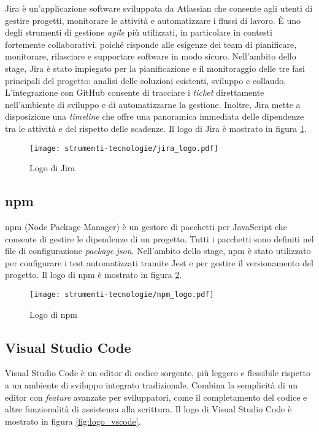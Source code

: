 \par Jira è un'applicazione software sviluppata da Atlassian che consente agli utenti di gestire progetti, monitorare le attività e automatizzare i flussi di lavoro. È uno degli strumenti di gestione \textit{agile} più utilizzati, in particolare in contesti fortemente collaborativi, poiché risponde alle esigenze dei team di pianificare, monitorare, rilasciare e supportare software in modo sicuro. Nell’ambito dello stage, Jira è stato impiegato per la pianificazione e il monitoraggio delle tre fasi principali del progetto: analisi delle soluzioni esistenti, sviluppo e collaudo. L’integrazione con GitHub consente di tracciare i \textit{ticket} direttamente nell’ambiente di sviluppo e di automatizzarne la gestione. Inoltre, Jira mette a disposizione una \textit{timeline} che offre una panoramica immediata delle dipendenze tra le attività e del rispetto delle scadenze. Il logo di Jira è mostrato in figura \ref{fig:logo_jira}.

\begin{figure}[H]
  \centering 
  \texttt{[image: strumenti-tecnologie/jira\_logo.pdf]} 
  \caption{Logo di Jira}
  \label{fig:logo_jira}
\end{figure}

\subsection*{npm}

\par npm (Node Package Manager) è un gestore di pacchetti per JavaScript che consente di gestire le dipendenze di un progetto. Tutti i pacchetti sono definiti nel file di configurazione \textit{package.json}. Nell’ambito dello stage, npm è stato utilizzato per configurare i test automatizzati tramite Jest e per gestire il versionamento del progetto. Il logo di npm è mostrato in figura \ref{fig:logo_npm}.

\begin{figure}[H]
  \centering 
  \texttt{[image: strumenti-tecnologie/npm\_logo.pdf]}
  \caption{Logo di npm}
  \label{fig:logo_npm} 
\end{figure}

\subsection*{Visual Studio Code}

\par Visual Studio Code è un editor di codice sorgente, più leggero e flessibile rispetto a un ambiente di sviluppo integrato tradizionale. Combina la semplicità di un editor con \textit{feature} avanzate per sviluppatori, come il completamento del codice e altre funzionalità di assistenza alla scrittura. Il logo di Visual Studio Code è mostrato in figura \ref{fig:logo_vscode}.

